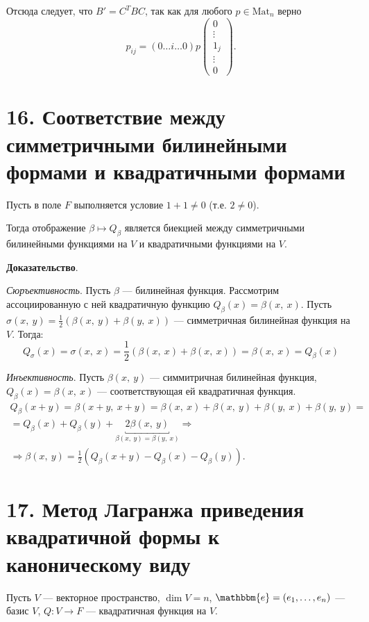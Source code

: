 \documentclass[a4paper, 12pt]{article}
\newcommand{\me}{\mathbbm{e}}
\begin{document}
Отсюда следует, что $B' = C^TBC$, так как  для любого $p \in \text{Mat}_n$ верно 
\vspace{-3mm}
\[
p_{ij} =  (0 \ldots i \ldots 0)p
\begin{pmatrix}
0 \\
\vdots \\
1_j \\
\vdots \\
0
\end{pmatrix}.
\]

\section*{16. Соответствие между симметричными билинейными формами и квадратичными формами}
Пусть в поле $F$ выполняется условие $1 + 1 \neq 0$ (т.е. $2 \neq 0$).

Тогда отображение $\beta \mapsto Q_\beta$ является биекцией между симметричными билинейными функциями на $V$ и квадратичными функциями на $V$.

\textbf{Доказательство}.

\textit{Сюръективность}. Пусть $\beta$ --- билинейная функция. Рассмотрим ассоциированную с ней квадратичную функцию $Q_\beta(x) = \beta(x,\ x)$. Пусть $\sigma(x,\ y) = \frac{1}{2}(\beta(x,\ y) + \beta(y, \ x))$ --- симметричная билинейная функция на $V$. Тогда:
\vspace{-3mm}
\[
Q_\sigma(x) = \sigma(x,\ x) = \frac{1}{2}(\beta(x,\ x) + \beta(x, \ x)) = \beta(x,\ x) = Q_\beta(x)
\]

\vspace{-3mm}
\textit{Инъективность}. Пусть $\beta(x,\ y)$ --- симмитричная билинейная функция, $Q_\beta(x) = \beta(x,\ x)$ --- соответствующая ей квадратичная функция.
\vspace{-3mm}
\begin{gather*}
Q_\beta(x + y) = \beta(x + y,\ x + y) = \beta(x,\ x) + \beta(x,\ y) + \beta(y,\ x) + \beta(y,\ y) = \\ = Q_\beta(x) + Q_\beta(y) + \underbracket{2\beta(x,\ y)}_{\beta(x,\ y) = \beta(y,\ x)} \Rightarrow \\ \Rightarrow \beta(x,\ y) = \frac{1}{2}(Q_\beta(x + y) - Q_\beta(x) - Q_\beta(y)).
\end{gather*}

\section*{17. Метод Лагранжа приведения квадратичной формы к каноническому виду}
Пусть $V$ --- векторное пространство, $\dim V = n$, $\me = (e_1, \ldots, e_n)$ --- базис $V$, $Q: V \rightarrow F$ --- квадратичная функция на $V$.
\end{document}

